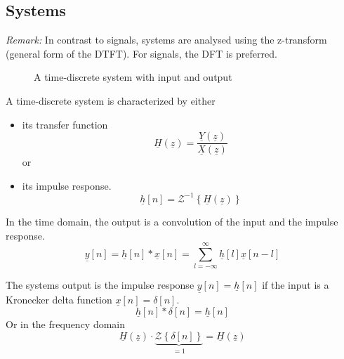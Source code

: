 \begin{refsection}

\subsection{Systems}

\textit{Remark:} In contrast to signals, systems are analysed using the z-transform (general form of the \ac{DTFT}). For signals, the \ac{DFT} is preferred.

\begin{figure}[H]
	\centering
	\caption{A time-discrete system with input and output}
\end{figure}

A time-discrete system is characterized by either
\begin{itemize}
	\item its  transfer function
	\begin{equation}
		\underline{H}(\underline{z}) = \frac{\underline{Y}(\underline{z})}{\underline{X}(\underline{z})}
	\end{equation}
	or
	\item its impulse response.
	\begin{equation}
		\underline{h}[n] = \mathcal{Z}^{-1}\left\{\underline{H}(\underline{z})\right\}
	\end{equation}
\end{itemize}

In the time domain, the output is a convolution of the input and the impulse response.
\begin{equation}
	\underline{y}[n] = \underline{h}[n] * \underline{x}[n] = \sum\limits_{l = -\infty}^{\infty} \underline{h}[l] \underline{x}[n-l]
\end{equation}

The systems output is the impulse response $\underline{y}[n] = \underline{h}[n]$ if the input is a Kronecker delta function $\underline{x}[n] = \delta[n]$.
\begin{equation}
	\underline{h}[n] * \delta[n] = \underline{h}[n]
\end{equation}
Or in the frequency domain
\begin{equation}
	\underline{H}(\underline{z}) \cdot \underbrace{\mathcal{Z}\left\{\delta[n]\right\}}_{= 1} = \underline{H}(\underline{z})
\end{equation}


\end{refsection}
